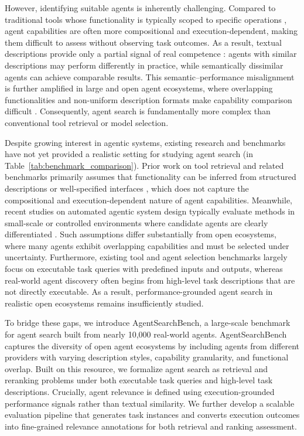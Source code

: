 \documentclass{article} %
\newcommand{\OURSBENCH}{AgentSearchBench}
\def \TAB {Table}
\begin{document}
However, identifying suitable agents is inherently challenging. Compared to traditional tools whose functionality is typically scoped to specific operations \citep{shi2025retrieval}, agent capabilities are often more compositional and execution-dependent, making them difficult to assess without observing task outcomes. As a result, textual descriptions provide only a partial signal of real competence \citep{DBLP:conf/iclr/QuDWCWY0W25, wu2025joint, fang2025play2prompt}: agents with similar descriptions may perform differently in practice, while semantically dissimilar agents can achieve comparable results. This semantic–performance misalignment is further amplified in large and open agent ecosystems, where overlapping functionalities and non-uniform description formats make capability comparison difficult \citep{yuan2025easytool}. Consequently, agent search is fundamentally more complex than conventional tool retrieval or model selection.

Despite growing interest in agentic systems, existing research and benchmarks have not yet provided a realistic setting for studying agent search (in \TAB~\ref{tab:benchmark_comparison}). Prior work on tool retrieval and related benchmarks primarily assumes that functionality can be inferred from structured descriptions or well-specified interfaces \citep{DBLP:conf/iclr/QinLYZYLLCTQZHT24, shi2025retrieval}, which does not capture the compositional and execution-dependent nature of agent capabilities. Meanwhile, recent studies on automated agentic system design typically evaluate methods in small-scale or controlled environments where candidate agents are clearly differentiated \citep{DBLP:conf/iclr/ShangLZMLXL25, yuan2025automated}. Such assumptions differ substantially from open ecosystems, where many agents exhibit overlapping capabilities and must be selected under uncertainty. Furthermore, existing tool and agent selection benchmarks largely focus on executable task queries with predefined inputs and outputs, whereas real-world agent discovery often begins from high-level task descriptions that are not directly executable. As a result, performance-grounded agent search in realistic open ecosystems remains insufficiently studied.

To bridge these gaps, we introduce \OURSBENCH{}, a large-scale benchmark for agent search built from nearly 10,000 real-world agents. \OURSBENCH{} captures the diversity of open agent ecosystems by including agents from different providers with varying description styles, capability granularity, and functional overlap. Built on this resource, we formalize agent search as retrieval and reranking problems under both executable task queries and high-level task descriptions. Crucially, agent relevance is defined using execution-grounded performance signals rather than textual similarity. We further develop a scalable evaluation pipeline that generates task instances and converts execution outcomes into fine-grained relevance annotations for both retrieval and ranking assessment.
\end{document}
